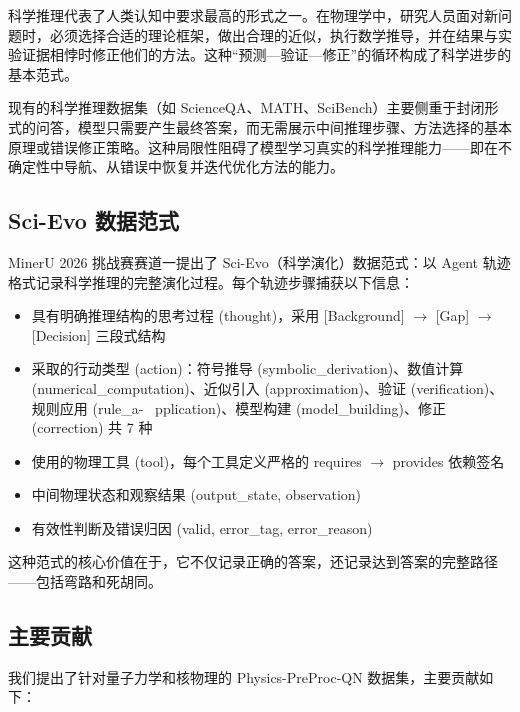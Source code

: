 \documentclass[12pt,a4paper]{article}
\begin{document}
科学推理代表了人类认知中要求最高的形式之一。在物理学中，研究人员面对新问题时，必须选择合适的理论框架，做出合理的近似，执行数学推导，并在结果与实验证据相悖时修正他们的方法。这种“预测—验证—修正”的循环构成了科学进步的基本范式。

现有的科学推理数据集（如 ScienceQA、MATH、SciBench）主要侧重于封闭形式的问答，模型只需要产生最终答案，而无需展示中间推理步骤、方法选择的基本原理或错误修正策略。这种局限性阻碍了模型学习真实的科学推理能力——即在不确定性中导航、从错误中恢复并迭代优化方法的能力。

\subsection{Sci-Evo 数据范式}

MinerU 2026 挑战赛赛道一提出了 Sci-Evo（科学演化）数据范式：以 Agent 轨迹格式记录科学推理的完整演化过程。每个轨迹步骤捕获以下信息：

\begin{itemize}
\item 具有明确推理结构的思考过程 (thought)，采用 [Background] $\rightarrow$ [Gap] $\rightarrow$ [Decision] 三段式结构
\item 采取的行动类型 (action)：符号推导 (symbolic\_derivation)、数值计算 (numerical\_computation)、近似引入 (approximation)、验证 (verification)、规则应用 (rule\_a- \ pplication)、模型构建 (model\_building)、修正 (correction) 共 7 种
\item 使用的物理工具 (tool)，每个工具定义严格的 requires $\rightarrow$ provides 依赖签名
\item 中间物理状态和观察结果 (output\_state, observation)
\item 有效性判断及错误归因 (valid, error\_tag, error\_reason)
\end{itemize}

这种范式的核心价值在于，它不仅记录正确的答案，还记录达到答案的完整路径——包括弯路和死胡同。

\subsection{主要贡献}

我们提出了针对量子力学和核物理的 Physics-PreProc-QN 数据集，主要贡献如下：
\end{document}
